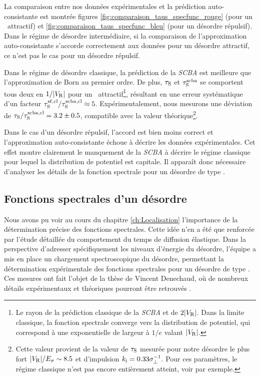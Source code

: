 La comparaison entre nos données expérimentales et la prédiction auto-consistante est montrée figures \ref{fig:comparaison_taus_specfunc_rouge} (pour un \speckle\ attractif) et \ref{fig:comparaison_taus_specfunc_bleu} (pour un désordre répulsif). Dans le régime de désordre intermédiaire, si la comparaison de l'approximation auto-consistante s'accorde correctement aux données pour un désordre attractif, ce n'est pas le cas pour un désordre répulsif. 

Dans le régime de désordre classique, la prédiction de la \textit{SCBA} est meilleure que l'approximation de Born au premier ordre. De plus, $\tau_{\mathrm{S}}$ et $\tau_{\mathrm{S}}^{\mathrm{scba}}$ se comportent tous deux en $1/|V_{\mathrm{R}}|$ pour un \speckle\ attractif\footnote{Le rayon de la prédiction classique de la \textit{SCBA} et de $2|V_{\mathrm{R}}|$. Dans la limite classique, la fonction spectrale converge vers la distribution de potentiel, qui correspond à une exponentielle de largeur à $1/e$ valant $|V_{\mathrm{R}}|$.}, résultant en une erreur systématique d'un facteur $\tau_{\mathrm{S}}^{\mathrm{sf,cl}}/\tau_{\mathrm{S}}^{\mathrm{scba,cl}}\approx 5$. Expérimentalement, nous mesurons une déviation de $\tau_{\mathrm{S}}/\tau_{\mathrm{S}}^{\mathrm{scba,cl}}=3.2\pm0.5$, compatible avec la valeur théorique\footnote{Cette valeur provient de la valeur de $\tau_{\mathrm{S}}$ mesurée pour notre désordre le plus fort $|V_{\mathrm{R}}|/E_{\sigma}\sim 8.5$ et d'impulsion $k_{\mathrm{i}}=0.33\sigma_{\perp}^{-1}$. Pour ces paramètres, le régime classique n'est pas encore entièrement atteint, voir \citep{prat2016semiclassical} par exemple.}. 

Dans le cas d'un désordre répulsif, l'accord est bien moins correct et l'approximation auto-consistante échoue à décrire les données expérimentales. Cet effet montre clairement le manquement de la \textit{SCBA} à décrire le régime classique pour lequel la distribution de potentiel est capitale. Il apparaît donc nécessaire d'analyser les détails de la fonction spectrale pour un désordre de type \speckle .







\subsection{Fonctions spectrales d'un désordre \speckle}
\label{sc:mesure_fonction_spectrale}
Nous avons pu voir au cours du chapitre \ref{ch:Localisation} l'importance de la détermination précise des fonctions spectrales. Cette idée n'en a été que renforcée par l'étude détaillée du comportement du temps de diffusion élastique. Dans la perspective d'adresser spécifiquement les niveaux d'énergie du désordre, l'équipe a mis en place un chargement spectroscopique du désordre, permettant la détermination expérimentale des fonctions spectrales pour un désordre de type \speckle . Ces mesures ont fait l'objet de la thèse de Vincent Denechaud, où de nombreux détails expérimentaux et théoriques pourront être retrouvés \citep{denechaud2018vers}.


